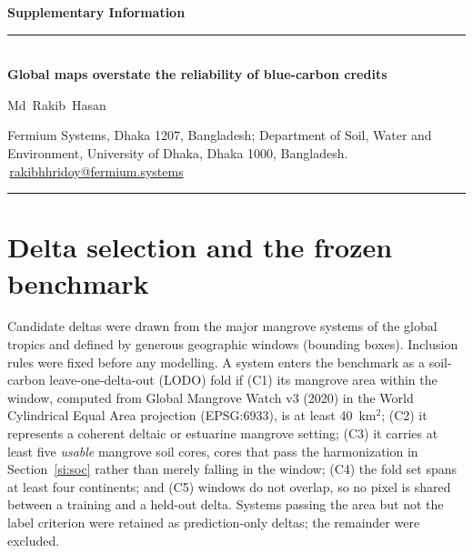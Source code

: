 \documentclass[10pt]{extarticle}
\begin{document}
\thispagestyle{fancy}
\begin{center}
{\sffamily\bfseries\large Supplementary Information}\\[5pt]
{\color{black}\rule{\textwidth}{1.0pt}}\\[8pt]
{\sffamily\bfseries\Large Global maps overstate the reliability of blue-carbon credits}\par
\vspace{8pt}
{\normalsize Md~Rakib~Hasan\,}\par
\vspace{4pt}
{\footnotesize\color{natgrey}Fermium Systems, Dhaka 1207, Bangladesh;\;
Department of Soil, Water and Environment, University of Dhaka, Dhaka 1000, Bangladesh.\\
\Letter\,\href{mailto:rakibhhridoy@fermium.systems}{rakibhhridoy@fermium.systems}}\par
\vspace{6pt}
{\color{black}\rule{\textwidth}{0.4pt}}
\end{center}
\vspace{8pt}

\section{Delta selection and the frozen benchmark}
Candidate deltas were drawn from the major mangrove systems of the global tropics and
defined by generous geographic windows (bounding boxes). Inclusion rules were fixed
before any modelling. A system enters the benchmark as a soil-carbon leave-one-delta-out
(LODO) fold if (C1) its mangrove area within the window, computed from Global Mangrove
Watch v3 (2020) in the World Cylindrical Equal Area projection (EPSG:6933), is at least
40~km$^2$; (C2) it represents a coherent deltaic or estuarine mangrove setting; (C3) it
carries at least five \emph{usable} mangrove soil cores, cores that pass the
harmonization in Section~\ref{si:soc} rather than merely falling in the window; (C4) the
fold set spans at least four continents; and (C5) windows do not overlap, so no pixel is
shared between a training and a held-out delta. Systems passing the area but not the
label criterion were retained as prediction-only deltas; the remainder were excluded.
\end{document}

